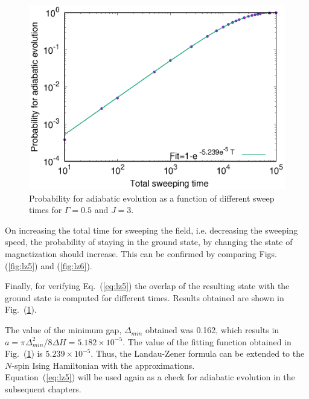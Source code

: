 \documentclass[../main.tex]{subfiles}
\begin{document}
\begin{figure}[H]
\centering 
\includegraphics[scale=0.8]{Probability_H100.eps}
\caption{Probability for adiabatic evolution as a function of different sweep times for $\Gamma=0.5$ and $J=3$.}
\label{fig:lz7}
\end{figure}

On increasing the total time for sweeping the field, i.e. decreasing the sweeping speed, the probability of staying in the ground state, by changing the state of magnetization should increase. This can be confirmed by comparing Figs. (\ref{fig:lz5}) and (\ref{fig:lz6}).

Finally, for verifying Eq.~({\ref{eq:lz5}}) the overlap of the resulting state with the ground state is computed for different times. Results obtained are shown in Fig.~(\ref{fig:lz7}). 

The value of the minimum gap, $\Delta_{min}$ obtained was 0.162, which results in $a={\pi \Delta_{min}^2/8 \Delta H}= 5.182 \times 10^{-5}$. The value of the fitting function obtained in Fig.~(\ref{fig:lz7}) is $5.239 \times 10^{-5}$. Thus, the Landau-Zener formula can be extended to the $N$-spin Ising Hamiltonian with the approximations.\\

Equation~(\ref{eq:lz5}) will be used again as a check for adiabatic evolution in the subsequent chapters.
\end{document}
